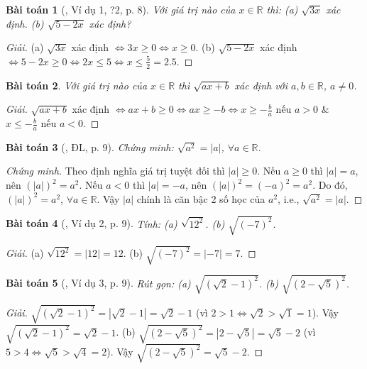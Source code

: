 \documentclass{article}
\newtheorem{baitoan}{Bài toán}
\begin{document}
\begin{baitoan}[\cite{SGK_Toan_9_tap_1}, Ví dụ 1, ?2, p. 8]
	Với giá trị nào của $x\in\mathbb{R}$ thì: (a) $\sqrt{3x}$ xác định. (b) $\sqrt{5 - 2x}$ xác định?
\end{baitoan}

\begin{proof}[Giải]
	(a) $\sqrt{3x}$ xác định $\Leftrightarrow3x\ge0\Leftrightarrow x\ge0$. (b) $\sqrt{5 - 2x}$ xác định $\Leftrightarrow5 - 2x\ge0\Leftrightarrow2x\le5\Leftrightarrow x\le\frac{5}{2} = 2.5$.
\end{proof}

\begin{baitoan}
	Với giá trị nào của $x\in\mathbb{R}$ thì $\sqrt{ax + b}$ xác định với $a,b\in\mathbb{R}$, $a\ne0$.
\end{baitoan}

\begin{proof}[Giải]
	$\sqrt{ax + b}$ xác định $\Leftrightarrow ax + b\ge0\Leftrightarrow ax\ge-b\Leftrightarrow x\ge-\frac{b}{a}$ nếu $a > 0$ \& $x\le-\frac{b}{a}$ nếu $a < 0$.
\end{proof}

\begin{baitoan}[\cite{SGK_Toan_9_tap_1}, ĐL, p. 9]
	Chứng minh: $\sqrt{a^2} = |a|$, $\forall a\in\mathbb{R}$.
\end{baitoan}

\begin{proof}[Chứng minh]
	Theo định nghĩa giá trị tuyệt đối thì $|a|\ge0$. Nếu $a\ge0$ thì $|a| = a$, nên $(|a|)^2 = a^2$. Nếu $a < 0$ thì $|a| = -a$, nên $(|a|)^2 = (-a)^2 = a^2$. Do đó, $(|a|)^2 = a^2$, $\forall a\in\mathbb{R}$. Vậy $|a|$ chính là căn bậc 2 số học của $a^2$, i.e., $\sqrt{a^2} = |a|$.
\end{proof}

\begin{baitoan}[\cite{SGK_Toan_9_tap_1}, Ví dụ 2, p. 9]
	Tính: (a) $\sqrt{12^2}$. (b) $\sqrt{(-7)^2}$.
\end{baitoan}

\begin{proof}[Giải]
	(a) $\sqrt{12^2} = |12| = 12$. (b) $\sqrt{(-7)^2} = |-7| = 7$.
\end{proof}

\begin{baitoan}[\cite{SGK_Toan_9_tap_1}, Ví dụ 3, p. 9]
	Rút gọn: (a) $\sqrt{(\sqrt{2} - 1)^2}$. (b) $\sqrt{(2 - \sqrt{5})^2}$.
\end{baitoan}

\begin{proof}[Giải]
	$\sqrt{(\sqrt{2} - 1)^2} = |\sqrt{2} - 1| = \sqrt{2} - 1$ (vì $2 > 1\Leftrightarrow\sqrt{2} > \sqrt{1} = 1$). Vậy $\sqrt{(\sqrt{2} - 1)^2} = \sqrt{2} - 1$. (b) $\sqrt{(2 - \sqrt{5})^2} = |2 - \sqrt{5}| = \sqrt{5} - 2$ (vì $5 > 4\Leftrightarrow\sqrt{5} > \sqrt{4} = 2$). Vậy $\sqrt{(2 - \sqrt{5})^2} = \sqrt{5} - 2$.
\end{proof}
\end{document}
